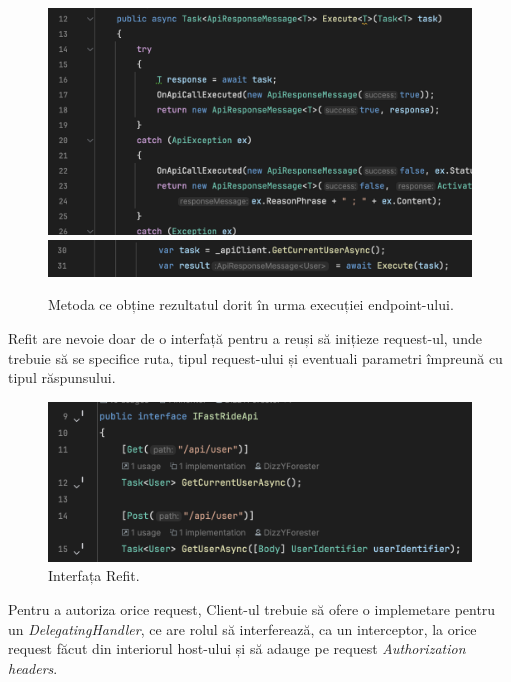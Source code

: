 \begin{figure}[H]
    \centering
    \includegraphics[width=14cm]{Assets/refitAbstract.png}
    \includegraphics[width=14cm]{Assets/userRefitAbstract.png}
    \caption{Metoda ce obține rezultatul dorit în urma execuției endpoint-ului.}
    \label{fig:refitAbstract}
\end{figure}

Refit are nevoie doar de o interfață pentru a reuși să inițieze request-ul, unde trebuie să se specifice ruta, tipul request-ului și eventuali parametri
împreună cu tipul răspunsului.

\begin{figure}[H]
    \centering
    \includegraphics[width=14cm]{Assets/refitInterface.png}
    \caption{Interfața Refit.}
    \label{fig:refitInterface}
\end{figure}

Pentru a autoriza orice request, Client-ul trebuie să ofere o implemetare pentru un \textit{DelegatingHandler}, ce 
are rolul să interferează, ca un interceptor, la orice request făcut din interiorul host-ului și să adauge
pe request \textit{Authorization headers}.

